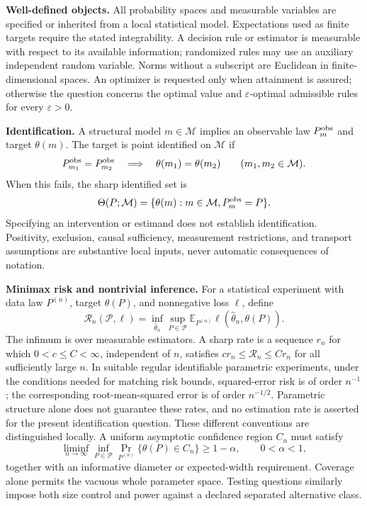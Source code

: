 \documentclass[11pt,a4paper]{article}
\newcommand{\E}{\mathbb E}
\begin{document}
\textbf{Well-defined objects.}
All probability spaces and measurable variables are specified or inherited
from a local statistical model. Expectations used as finite targets require
the stated integrability. A decision rule or estimator is measurable with
respect to its available information; randomized rules may use an auxiliary
independent random variable. Norms without a subscript are Euclidean in
finite-dimensional spaces. An optimizer is requested only when attainment
is assured; otherwise the question concerns the optimal value and
$\varepsilon$-optimal admissible rules for every $\varepsilon>0$.

\textbf{Identification.}
A structural model $m\in\mathcal M$ implies an observable law
$P_m^{\rm obs}$ and target $\theta(m)$. The target is point identified on
$\mathcal M$ if
\[
 P_{m_1}^{\rm obs}=P_{m_2}^{\rm obs}
 \quad\Longrightarrow\quad\theta(m_1)=\theta(m_2)
 \qquad(m_1,m_2\in\mathcal M).
\]
When this fails, the sharp identified set is
\[
 \Theta(P;\mathcal M)=\{\theta(m):m\in\mathcal M,
                                  P_m^{\rm obs}=P\}.
\]
Specifying an intervention or estimand does not establish identification.
Positivity, exclusion, causal sufficiency, measurement restrictions, and
transport assumptions are substantive local inputs, never automatic
consequences of notation.

\textbf{Minimax risk and nontrivial inference.}
For a statistical experiment with data law $P^{(n)}$, target $\theta(P)$,
and nonnegative loss $\ell$, define
\[
 \mathcal R_n(\mathcal P,\ell)
   =\inf_{\widehat\theta_n}\sup_{P\in\mathcal P}
      \E_{P^{(n)}}\ell(\widehat\theta_n,\theta(P)).
\]
The infimum is over measurable estimators. A sharp rate is a sequence
$r_n$ for which $0<c\leq C<\infty$, independent of $n$, satisfies
$c r_n\leq\mathcal R_n\leq C r_n$ for all sufficiently large $n$.
In suitable regular identifiable parametric experiments, under the conditions
needed for matching risk bounds, squared-error risk is of order $n^{-1}$;
the corresponding root-mean-squared error is of order $n^{-1/2}$.
Parametric structure alone does not guarantee these rates, and no estimation
rate is asserted for the present identification question. These different conventions
are distinguished locally. A uniform asymptotic confidence region $C_n$
must satisfy
\[
 \liminf_{n\to\infty}\inf_{P\in\mathcal P}
     \Pr_{P^{(n)}}\{\theta(P)\in C_n\}\geq 1-\alpha,
 \qquad 0<\alpha<1,
\]
together with an informative diameter or expected-width requirement.
Coverage alone permits the vacuous whole parameter space. Testing questions
similarly impose both size control and power against a declared separated
alternative class.
\end{document}

